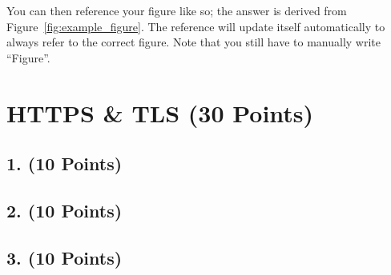 \documentclass[12pt,a4paper]{article}
\begin{document}
You can then reference your figure like so; the answer is derived from Figure~\ref{fig:example_figure}. The reference will update itself automatically to always refer to the correct figure. Note that you still have to manually write \enquote{Figure}.


\section*{HTTPS \& TLS (30 Points)}

\subsection*{1. (10 Points)}

\subsection*{2. (10 Points)}

\subsection*{3. (10 Points)}

\end{document}
